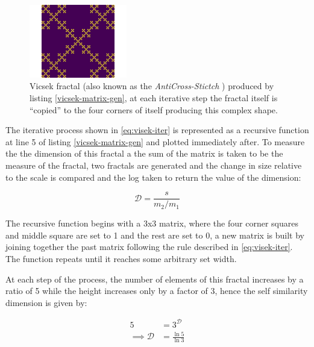 \documentclass[a4paper,11pt,twoside]{article}
\begin{document}
\begin{figure}
\centering
\includegraphics[width=0.38\textwidth]{media/Vicsek-Fractal.png}
\caption{\label{vicsek-fractal-julia}Vicsek fractal \cite[p. 12]{vicsekFractalGrowthPhenomena1992} (also known as the \emph{AntiCross-Stictch} \cite{janwassenaarCantorDust2005}) produced by listing \ref{vicsek-matrix-gen}, at each iterative step the fractal itself is ``copied'' to the four corners of itself producing this complex shape.}
\end{figure}


The iterative process shown in \eqref{eq:visek-iter} is represented as a recursive function at line 5 of listing \ref{vicsek-matrix-gen} and plotted immediately after. To measure the the dimension of this fractal a the sum of the matrix is taken to be the measure of the fractal, two fractals are generated and the change in size relative to the scale is compared and the log taken to return the value of the dimension:

\[
\mathcal{D} = \frac{s}{m_{2}/m_{1}}
\]

The recursive function begins with a 3x3 matrix, where the four corner squares
and middle square are set to 1 and the rest are set to 0, a new matrix is built
by joining together the past matrix following the rule described in \eqref{eq:visek-iter}.
The function repeats until it reaches some arbitrary set width.


At each step of the process, the number of elements of this fractal increases by
a ratio of 5 while the height increases only by a factor of 3, hence the self
similarity dimension is given by:


\begin{align}
5 &= 3^{\mathcal{D}} \nonumber \\
\implies \mathcal{D} &= \frac{\ln 5}{\ln 3} \label{eq:vic-dim-val}
\end{align}
\end{document}
